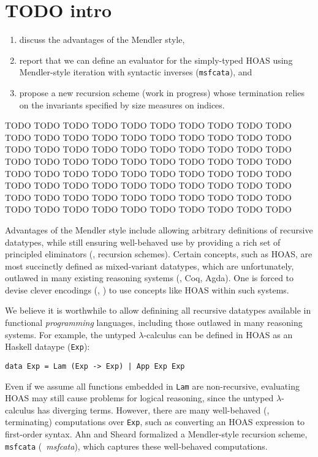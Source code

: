 \section{TODO intro}\label{sec:intro}
\begin{enumerate}
	\item discuss the advantages of the Mendler style,
	\item report that we can define an evaluator for the simply-typed HOAS
		using Mendler-style iteration with syntactic inverses
		(\lstinline{msfcata}), and
	\item propose a new recursion scheme (work in progress) whose
		termination relies on the invariants specified by
		size measures on indices.
\end{enumerate}

TODO TODO TODO TODO TODO TODO TODO TODO TODO TODO TODO TODO TODO TODO TODO TODO
TODO TODO TODO TODO TODO TODO TODO TODO TODO TODO TODO TODO TODO TODO TODO TODO
TODO TODO TODO TODO TODO TODO TODO TODO TODO TODO TODO TODO TODO TODO TODO TODO
TODO TODO TODO TODO TODO TODO TODO TODO TODO TODO TODO TODO TODO TODO TODO TODO
TODO TODO TODO TODO TODO TODO TODO TODO TODO TODO TODO TODO TODO TODO TODO TODO

Advantages of the Mendler style include allowing arbitrary definitions of
recursive datatypes, while still ensuring well-behaved use by providing
a rich set of principled eliminators (\ie, recursion schemes).
Certain concepts, such as HOAS, are most succinctly defined as
mixed-variant datatypes, which are unfortunately, outlawed in many existing
reasoning systems (\eg, Coq, Agda). One is forced to devise clever encodings
(\eg, \cite{PHOAS}) to use concepts like HOAS within such systems.

We believe it is worthwhile to allow definining all recursive datatypes
available in functional \emph{programming} languages, including those outlawed
in many reasoning systems. For example, the untyped $\lambda$-calculus can be
defined in HOAS as an Haskell dataype (\lstinline{Exp}):
\begin{lstlisting}
data Exp = Lam (Exp -> Exp) | App Exp Exp
\end{lstlisting}
Even if we assume all functions embedded in \lstinline{Lam} are non-recursive,
evaluating HOAS may still cause problems for logical reasoning, since
the untyped $\lambda$-calculus has diverging terms. However, there are many
well-behaved (\ie, terminating) computations over \lstinline{Exp}, such as
converting an HOAS expression to first-order syntax.
Ahn and Sheard \cite{AhnShe11} formalized a Mendler-style recursion scheme,
\lstinline{msfcata}  (\aka\ \textit{msfcata}), which captures these
well-behaved computations.

